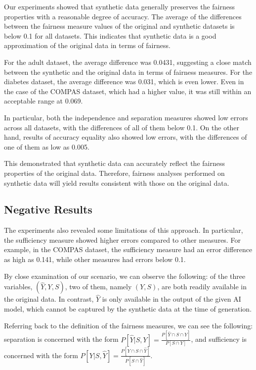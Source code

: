\documentclass[manuscript,screen,review,anonymous]{acmart}
\begin{document}

Our experiments showed that synthetic data generally preserves the fairness properties with a reasonable degree of accuracy. The average of the differences between the fairness measure values of the original and synthetic datasets is below 0.1 for all datasets. This indicates that synthetic data is a good approximation of the original data in terms of fairness.

For the adult dataset, the average difference was 0.0431, suggesting a close match between the synthetic and the original data in terms of fairness measures. For the diabetes dataset, the average difference was 0.031, which is even lower. Even in the case of the COMPAS dataset, which had a higher value, it was still within an acceptable range at 0.069.

In particular, both the independence and separation measures showed low errors across all datasets, with the differences of all of them below 0.1. On the other hand, results of accuracy equality also showed low errors, with the differences of one of them as low as 0.005.

This demonstrated that synthetic data can accurately reflect the fairness properties of the original data. Therefore, fairness analyses performed on synthetic data will yield results consistent with those on the original data.

\subsection{Negative Results}


The experiments also revealed some limitations of this approach. In particular, the sufficiency measure showed higher errors compared to other measures. For example, in the COMPAS dataset, the sufficiency measure had an error difference as high as 0.141, while other measures had errors below 0.1.

By close examination of our scenario, we can observe the following: of the three variables, $(\hat{Y},Y,S)$, two of them, namely $(Y,S)$, are both readily available in the original data. In contrast, $\hat{Y}$ is only available in the output of the given AI model, which cannot be captured by the synthetic data at the time of generation.

Referring back to the definition of the fairness measures, we can see the following: separation is concerned with the form $P[\hat{Y} | S, Y] = \frac{P[\hat{Y} \cap S \cap Y]}{P[{S} \cap Y]}$, and sufficiency is concerned with the form $P[Y | S, \hat{Y}] = \frac{P[Y \cap S \cap \hat{Y}]}{P[{S} \cap \hat{Y}]}$.
\end{document}
